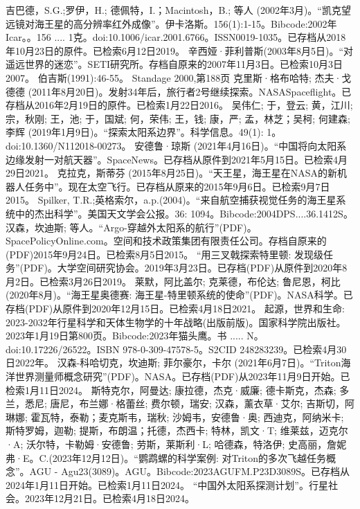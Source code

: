 \begin{enumerate}
 吉巴德，S.G.;罗伊，H.; 德佩特，I.；Macintosh，B.; 等人 (2002年3月)。“凯克望远镜对海王星的高分辨率红外成像”。伊卡洛斯。156(1):1-15。Bibcode:2002年Icar。。156 .... 1克。doi:10.1006/icar.2001.6766。ISSN0019-1035。已存档从2018年10月23日的原件。已检索6月12日2019。 
 辛西娅·菲利普斯(2003年8月5日)。“对遥远世界的迷恋”。SETI研究所。存档自原来的2007年11月3日。已检索10月3日2007。
 伯吉斯(1991):46-55。
 Standage 2000,第188页
 克里斯·格布哈特; 杰夫·戈德德 (2011年8月20日)。发射34年后，旅行者2号继续探索。NASASpaceflight。已存档从2016年2月19日的原件。已检索1月22日2016。
 吴伟仁; 于，登云; 黄，江川; 宗，秋刚; 王，池; 于，国斌; 何，荣伟; 王，钱; 康，严; 孟，林芝；吴柯; 何建森; 李辉 (2019年1月9日)。“探索太阳系边界”。科学信息。49(1): 1。doi:10.1360/N112018-00273。
 安德鲁·琼斯 (2021年4月16日)。“中国将向太阳系边缘发射一对航天器”。SpaceNews。已存档从原件到2021年5月15日。已检索4月29日2021。
 克拉克，斯蒂芬 (2015年8月25日)。“天王星，海王星在NASA的新机器人任务中”。现在太空飞行。已存档从原来的2015年9月6日。已检索9月7日2015。
 Spilker, T.R.;英格索尔，a.p.(2004)。“来自航空捕获视觉任务的海王星系统中的杰出科学”。美国天文学会公报。36: 1094。Bibcode:2004DPS....36.1412S。
 汉森，坎迪斯; 等人。“Argo-穿越外太阳系的航行”(PDF)。SpacePolicyOnline.com。空间和技术政策集团有限责任公司。存档自原来的(PDF)2015年9月24日。已检索8月5日2015。
 “用三叉戟探索特里顿: 发现级任务”(PDF)。大学空间研究协会。2019年3月23日。已存档(PDF)从原件到2020年8月2日。已检索3月26日2019。
 莱默，阿比盖尔; 克莱德，布伦达; 鲁尼恩，柯比 (2020年8月)。“海王星奥德赛: 海王星-特里顿系统的使命”(PDF)。NASA科学。已存档(PDF)从原件到2020年12月15日。已检索4月18日2021。
 起源，世界和生命: 2023-2032年行星科学和天体生物学的十年战略(出版前版)。国家科学院出版社。2023年1月19日第800页。Bibcode:2023年猫头鹰。书 ..... N。doi:10.17226/26522。ISBN 978-0-309-47578-5。S2CID 248283239。已检索4月30日2022年。
 汉森-科哈切克，坎迪斯; 菲尔豪尔，卡尔 (2021年6月7日)。“Triton海洋世界测量师概念研究”(PDF)。NASA。已存档(PDF)从2023年11月9日开始。已检索1月11日2024。
 斯特克尔，阿曼达; 康拉德，杰克·威廉; 德卡斯克，杰森; 多兰，悉尼; 唐尼，布兰娜·格蕾丝; 费尔顿，瑞安; 汉森，薰衣草·艾尔; 吉斯切，阿琳娜; 霍瓦特，泰勒；麦克斯韦，瑞秋; 沙姆韦，安德鲁·奥; 西迪克，阿纳米卡; 斯特罗姆，迦勒; 提斯，布朗温；托德，杰西卡; 特林，凯文·T; 维莱兹，迈克尔·A; 沃尔特，卡勒姆·安德鲁; 劳斯，莱斯利·L; 哈德森，特洛伊; 史高丽，詹妮弗·E。C.(2023年12月12日)。“鹦鹉螺的科学案例: 对Triton的多次飞越任务概念”。AGU - Agu23(3089)。AGU。Bibcode:2023AGUFM.P23D3089S。已存档从2024年1月11日开始。已检索1月11日2024。
 “中国外太阳系探测计划”。行星社会。2023年12月21日。已检索4月18日2024。
\end{enumerate}




